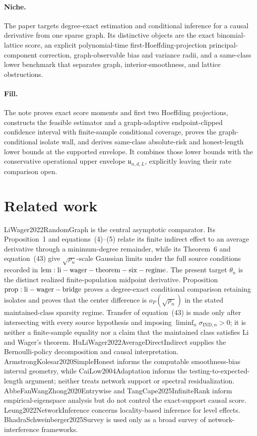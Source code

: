 \documentclass{article}
\begin{document}
\paragraph{Niche.} The paper targets degree-exact estimation and conditional inference for a causal derivative from one sparse graph.  Its distinctive objects are the exact binomial-lattice score, an explicit polynomial-time first-Hoeffding-projection principal-component correction, graph-observable bias and variance radii, and a same-class lower benchmark that separates graph, interior-smoothness, and lattice obstructions.

\paragraph{Fill.} The note proves exact score moments and first two Hoeffding projections, constructs the feasible estimator and a graph-adaptive endpoint-clipped confidence interval with finite-sample conditional coverage, proves the graph-conditional isolate wall, and derives same-class absolute-risk and honest-length lower bounds at the supported envelope.  It combines those lower bounds with the conservative operational upper envelope \(\mathfrak u_{n,d,L}\), explicitly leaving their rate comparison open.

\section{Related work}

LiWager2022RandomGraph is the central asymptotic comparator. Its Proposition~1 and equations~(4)--(5) relate its finite indirect effect to an average derivative through a minimum-degree remainder, while its Theorem~6 and equation~(43) give \(\sqrt{\rho_n}\)-scale Gaussian limits under the full source conditions recorded in \({\rm lem:li-wager-theorem-six-regime}\). The present target \(\theta_n\) is the distinct realized finite-population midpoint derivative. Proposition~\({\rm prop:li-wager-bridge}\) proves a degree-exact conditional comparison retaining isolates and proves that the center difference is \(o_P(\sqrt{\rho_n})\) in the stated maintained-class sparsity regime. Transfer of equation~(43) is made only after intersecting with every source hypothesis and imposing \(\liminf_n\sigma_{\mathrm{IND},n}>0\); it is neither a finite-sample equality nor a claim that the maintained class satisfies Li and Wager's theorem. HuLiWager2022AverageDirectIndirect supplies the Bernoulli-policy decomposition and causal interpretation. ArmstrongKolesar2020SimpleHonest informs the computable smoothness-bias interval geometry, while CaiLow2004Adaptation informs the testing-to-expected-length argument; neither treats network support or spectral residualization. AbbeFanWangZhong2020Entrywise and TangCape2025InfiniteRank inform empirical-eigenspace analysis but do not control the exact-support causal score. Leung2022NetworkInference concerns locality-based inference for level effects. BhadraSchweinberger2025Survey is used only as a broad survey of network-interference frameworks.
\end{document}
